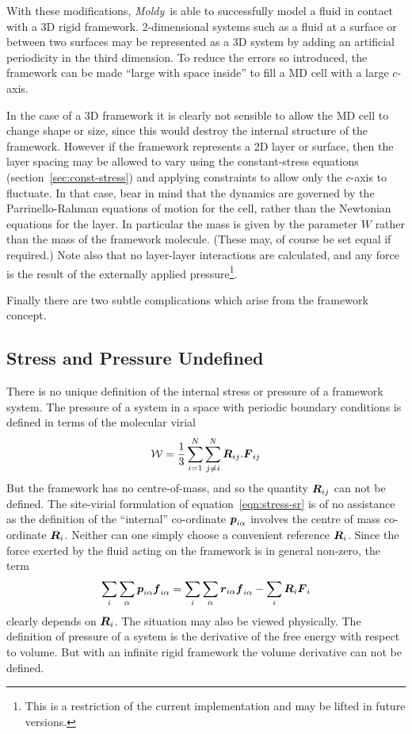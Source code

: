 \documentclass[twoside]{report}
\newcommand{\moldy}{{\em Moldy}}
\newcommand{\bm}[1]{\mbox{\boldmath \protect\(#1\protect\)}}
\begin{document}
With these modifications, \moldy\ is able to successfully model a fluid
in contact with a 3D rigid framework. 2-dimensional systems such as a
fluid at a surface or between two surfaces may be represented as a 3D
system by adding an artificial periodicity in the third dimension. To
reduce the errors so introduced, the framework can be made ``large
with space inside'' to fill a MD cell with a large $c$-axis.  

In the case of a 3D framework it is clearly not sensible to allow the
MD cell to change shape or size, since this would destroy the internal
structure of the framework.  However if the framework represents a 2D
layer or surface, then the layer spacing may be allowed to vary using
the constant-stress equations (section~\ref{sec:const-stress}) and
applying constraints to allow only the $c$-axis to fluctuate.  In that
case, bear in mind that the dynamics are governed by the
Parrinello-Rahman equations of motion for the cell, rather than the
Newtonian equations for the layer.  In particular the mass is given by
the parameter $W$ rather than the mass of the framework molecule.
(These may, of course be set equal if required.)  Note also that no
layer-layer interactions are calculated, and any force is the result
of the externally applied pressure\footnote{This is a restriction of
the current implementation and may be lifted in future versions.}.

Finally there are two subtle complications which arise from the
framework concept.

\subsection{Stress and Pressure Undefined}
There is no unique definition of the internal stress or pressure of a
framework system.    The pressure of a system in a space with periodic
boundary conditions  is defined in terms of the molecular virial
\begin{equation}
\label{eqn:virial}
{\cal W} = \frac{1}{3} \sum_{i=1}^N \sum_{j \neq i}^N \bm{R}_{ij}.\bm{F}_{ij}
\end{equation}
But the framework has no centre-of-mass, and so the quantity
$\bm{R}_{ij}$ can not be defined.  The site-virial formulation of
equation~\ref{eqn:stress-sr} is of no assistance as the definition of the
``internal'' co-ordinate $\bm{p}_{i\alpha}$ involves the centre of
mass co-ordinate $\bm{R}_i$.  Neither can one simply choose a
convenient reference $\bm{R}_i$.  Since the force exerted by the fluid
acting on the framework is in general non-zero, the term
\begin{equation}
\sum_i \sum_\alpha \bm{p}_{i\alpha} \bm{f}_{i\alpha}
= \sum_i \sum_\alpha \bm{r}_{i\alpha} \bm{f}_{i\alpha}
- \sum_i \bm{R}_i \bm{F}_i
\end{equation}
clearly depends on $\bm{R}_i$.  The situation may also be viewed
physically.  The definition of pressure of a system is the derivative
of the free energy with respect to volume.  But with an infinite rigid
framework the volume derivative can not be defined.
\end{document}
